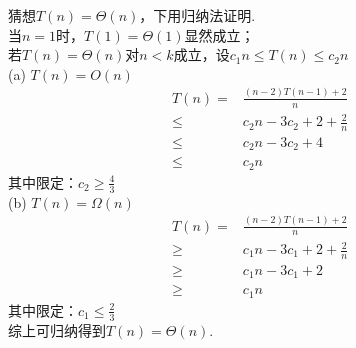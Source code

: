 \begin{solution}
    猜想$T(n)=\Theta(n)$，下用归纳法证明.\\
    当$n=1$时，$T(1)=\Theta(1)$显然成立；\\
    若$T(n)=\Theta(n)$对$n<k$成立，设$c_1n \le T(n) \le c_2n$\\
    (a) $T(n)=O(n)$
    \begin{align*}
        T(n) = & \frac{(n-2)T(n-1)+2}{n}\\
        \le & c_2n - 3c_2 + 2 + \frac{2}{n}\\
        \le & c_2n - 3c_2 + 4\\
        \le & c_2n
    \end{align*}
    其中限定：$c_2 \ge \frac{4}{3}$\\
    (b) $T(n)=\Omega(n)$
    \begin{align*}
        T(n) = & \frac{(n-2)T(n-1)+2}{n}\\
        \ge & c_1n - 3c_1 + 2 + \frac{2}{n}\\
        \ge & c_1n - 3c_1 + 2\\
        \ge & c_1n
    \end{align*}
    其中限定：$c_1 \le \frac{2}{3}$\\
    综上可归纳得到$T(n)=\Theta(n)$.
\end{solution}